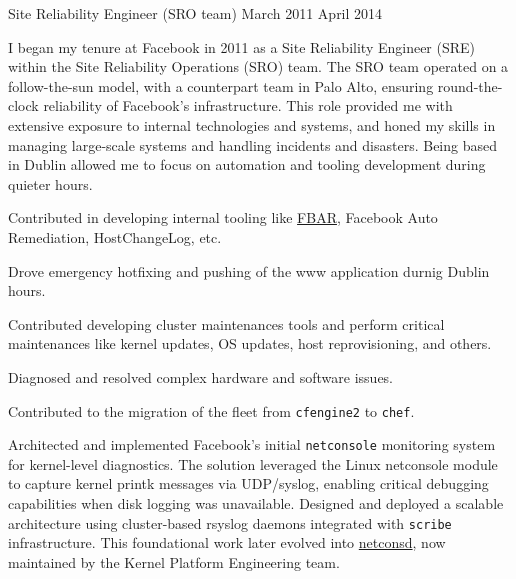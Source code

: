 \begin{cventries}
  \cventryprevrole
  {Site Reliability Engineer (SRO team)}
  {
    March 2011 \newline April 2014
  }
  {
    I began my tenure at Facebook in 2011 as a Site Reliability Engineer (SRE) within the Site Reliability Operations (SRO) team. The SRO team operated on a follow-the-sun model, with a counterpart team in Palo Alto, ensuring round-the-clock reliability of Facebook's infrastructure. This role provided me with extensive exposure to internal technologies and systems, and honed my skills in managing large-scale systems and handling incidents and disasters. Being based in Dublin allowed me to focus on automation and tooling development during quieter hours.
    \vspace{2mm}
    \begin{cvitems}
      \item {Contributed in developing internal tooling like \href{https://engineering.fb.com/2011/09/15/data-center-engineering/making-facebook-self-healing/}{FBAR}, Facebook Auto Remediation, HostChangeLog, etc.}
      \item {Drove emergency hotfixing and pushing of the www application durnig Dublin hours.}
      \item {Contributed developing cluster maintenances tools and perform critical maintenances like kernel updates, OS updates, host reprovisioning, and others.}
      \item {Diagnosed and resolved complex hardware and software issues.}
      \item {Contributed to the migration of the fleet from \texttt{cfengine2} to \texttt{chef}.}
      \item {Architected and implemented Facebook's initial \texttt{netconsole} monitoring system for kernel-level diagnostics.
                  The solution leveraged the Linux netconsole module to capture kernel printk messages via UDP/syslog, enabling critical
                  debugging capabilities when disk logging was unavailable. Designed and deployed a scalable architecture using
                  cluster-based rsyslog daemons integrated with \texttt{scribe} infrastructure. This foundational work later evolved
                  into \href{https://github.com/facebook/netconsd}{netconsd}, now maintained by the Kernel Platform Engineering team.}
    \end{cvitems}
  }


\end{cventries}
